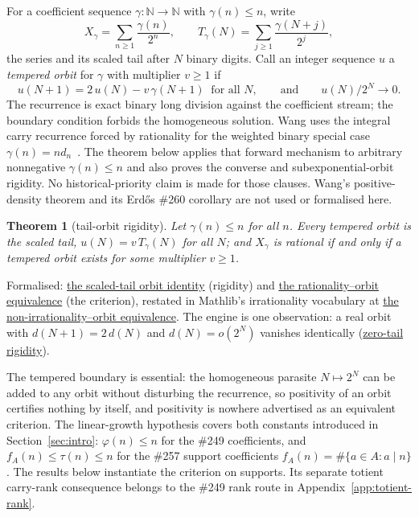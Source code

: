 \documentclass[11pt]{article}
\newcommand{\commit}{ebc98ee71f6819bd9fe344a0bb343542c604e533}
\newcommand{\repobase}{https://github.com/wcook04/plectis-lean-erdos249-257/blob/\commit}
\newcommand{\PK}{Erdos249257}
\newcommand{\lword}[4]{\href{\repobase/\PK/#1\#L#2}{#4}}
\newtheorem{theorem}{Theorem}[section]
\theoremstyle{definition}
\theoremstyle{remark}
\newcommand{\N}{\mathbb{N}}
\newcommand{\ph}{\varphi}
\begin{document}
For a coefficient sequence $\gamma:\N\to\N$ with $\gamma(n)\le n$, write
\[
X_\gamma=\sum_{n\ge1}\frac{\gamma(n)}{2^n},
\qquad
T_\gamma(N)=\sum_{j\ge1}\frac{\gamma(N+j)}{2^j},
\]
the series and its scaled tail after $N$ binary digits. Call an integer
sequence $u$ a \emph{tempered orbit} for $\gamma$ with multiplier $v\ge1$ if
\[
u(N+1)=2\,u(N)-v\,\gamma(N+1)\ \text{ for all } N,
\qquad\text{and}\qquad
u(N)/2^N\to0 .
\]
The recurrence is exact binary long division against the coefficient stream;
the boundary condition forbids the homogeneous solution. Wang uses the
integral carry recurrence forced by rationality for the weighted binary
special case $\gamma(n)=n d_n$~\cite[Section~3]{wang2026}. The theorem below applies that
forward mechanism to arbitrary nonnegative $\gamma(n)\le n$ and also proves
the converse and subexponential-orbit rigidity.  No historical-priority claim
is made for those clauses. Wang's positive-density theorem and its Erd\H{o}s
\#260 corollary are not used or formalised here.

\begin{theorem}[tail-orbit rigidity]\label{res:rigidity}
Let $\gamma(n)\le n$ for all $n$. Every tempered orbit is the scaled tail,
$u(N)=v\,T_\gamma(N)$ for all $N$; and $X_\gamma$ is rational if and only if a tempered
orbit exists for some multiplier $v\ge1$.
\end{theorem}
\noindent Formalised:
\lword{GenericTailOrbitRigidity.lean}{338}{temperedBinaryOrbit_eq_scaledTail}{the scaled-tail orbit identity}
(rigidity) and
\lword{GenericTailOrbitRigidity.lean}{425}{binaryCoeffSeries_rational_iff_exists_temperedBinaryOrbit}{the rationality--orbit equivalence}
(the criterion), restated in Mathlib's irrationality vocabulary at
\lword{GenericTailOrbitRigidity.lean}{434}{not_irrational_binaryCoeffSeries_iff_exists_temperedBinaryOrbit}{the non-irrationality--orbit equivalence}.
The engine is one observation: a real orbit with $d(N+1)=2\,d(N)$ and
$d(N)=o(2^N)$ vanishes identically
(\lword{GenericTailOrbitRigidity.lean}{314}{doublingOrbit_eq_zero_of_tempered}{zero-tail rigidity}).

The tempered boundary is essential: the
homogeneous parasite $N\mapsto2^N$ can be added to any orbit without
disturbing the recurrence, so positivity of an orbit certifies nothing by
itself, and positivity is nowhere advertised as an equivalent criterion. The
linear-growth hypothesis covers both constants introduced in
Section~\ref{sec:intro}:
$\ph(n)\le n$ for the \#249 coefficients, and $f_A(n)\le\tau(n)\le n$ for the
\#257 support coefficients $f_A(n)=\#\{a\in A:a\mid n\}$.  The results below
instantiate the criterion on supports.  Its separate totient
carry-rank consequence belongs to the \#249 rank route in
Appendix~\ref{app:totient-rank}.
\end{document}
